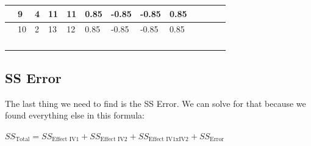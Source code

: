 \documentclass[
]{book}
\begin{document}
\begin{table}
\begin{tabular}{l|l|l|l|l|l|l|l|l|>{}l|>{}l|>{}l|>{}l}
\hline
 & 9 & 4 & 11 & 11 & 0.85 & -0.85 & -0.85 & 0.85 & \cellcolor{yellow}{0.7225} & \cellcolor{yellow}{0.7225} & \cellcolor{yellow}{0.7225} & \cellcolor{yellow}{0.7225}\\
\hline
 & 10 & 2 & 13 & 12 & 0.85 & -0.85 & -0.85 & 0.85 & \cellcolor{yellow}{0.7225} & \cellcolor{yellow}{0.7225} & \cellcolor{yellow}{0.7225} & \cellcolor{yellow}{0.7225}\\
\hline
\cellcolor{lightgreen}{Means} & \cellcolor{lightgreen}{9.6} & \cellcolor{lightgreen}{3.6} & \cellcolor{lightgreen}{12.6} & \cellcolor{lightgreen}{10} & \cellcolor{lightgreen}{} & \cellcolor{lightgreen}{} & \cellcolor{lightgreen}{} & \cellcolor{lightgreen}{} & \cellcolor{yellow}{} & \cellcolor{yellow}{} & \cellcolor{yellow}{} & \cellcolor{yellow}{}\\
\hline
\cellcolor{lightgreen}{Grand Mean} & \cellcolor{lightgreen}{8.95} & \cellcolor{lightgreen}{} & \cellcolor{lightgreen}{} & \cellcolor{lightgreen}{} & \cellcolor{lightgreen}{} & \cellcolor{lightgreen}{} & \cellcolor{lightgreen}{} & \cellcolor{lightgreen}{} & \cellcolor{yellow}{} & \cellcolor{yellow}{} & \cellcolor{yellow}{} & \cellcolor{yellow}{}\\
\hline
\cellcolor{yellow}{sums} & \cellcolor{yellow}{} & \cellcolor{yellow}{} & \cellcolor{yellow}{} & \cellcolor{yellow}{} & \cellcolor{yellow}{} & \cellcolor{yellow}{} & \cellcolor{yellow}{} & \cellcolor{yellow}{Sums} & \cellcolor{yellow}{3.6125} & \cellcolor{yellow}{3.6125} & \cellcolor{yellow}{3.6125} & \cellcolor{yellow}{3.6125}\\
\hline
\cellcolor{yellow}{SS Interaction} & \cellcolor{yellow}{} & \cellcolor{yellow}{} & \cellcolor{yellow}{} & \cellcolor{yellow}{} & \cellcolor{yellow}{} & \cellcolor{yellow}{} & \cellcolor{yellow}{} & \cellcolor{yellow}{SS Interaction} & \cellcolor{yellow}{14.45} & \cellcolor{yellow}{} & \cellcolor{yellow}{} & \cellcolor{yellow}{}\\
\hline
\end{tabular}
\end{table}

\subsection{SS Error}\label{ss-error-1}

The last thing we need to find is the SS Error. We can solve for that because we found everything else in this formula:

\(SS_\text{Total} = SS_\text{Effect IV1} + SS_\text{Effect IV2} + SS_\text{Effect IV1xIV2} + SS_\text{Error}\)
\end{document}
